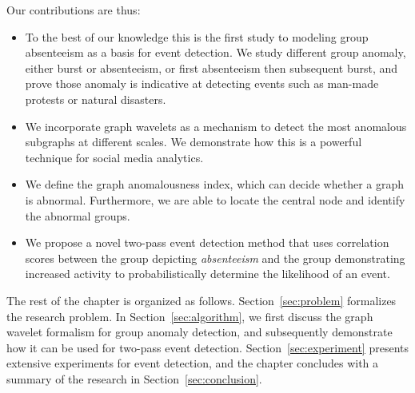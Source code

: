 Our contributions are thus:
\begin{itemize}
\item To the best of our knowledge this is the first study to modeling group absenteeism as a basis for event detection. We study different group anomaly, either burst or absenteeism, or first absenteeism then subsequent burst, and prove those anomaly is indicative at detecting events such as man-made protests or natural disasters.
\item We incorporate graph wavelets as a mechanism to detect the most anomalous subgraphs at different scales. We demonstrate how this is a powerful technique for social media analytics.
\item We define the graph anomalousness index, which can decide whether a graph is abnormal. Furthermore, we are able to locate the central node and identify the abnormal groups.
\item We propose a novel two-pass event detection method that uses correlation scores between the group depicting \textit{absenteeism} and the group demonstrating increased activity to probabilistically determine the likelihood of an event.
\end{itemize}

The rest of the chapter is organized as follows. Section~\ref{sec:problem} formalizes the research problem. In Section~\ref{sec:algorithm}, we first discuss the graph wavelet formalism for group anomaly detection, and subsequently demonstrate how it can be used for two-pass event detection. Section~\ref{sec:experiment} presents extensive experiments for event detection, and the chapter concludes with a summary of the research in Section~\ref{sec:conclusion}.

